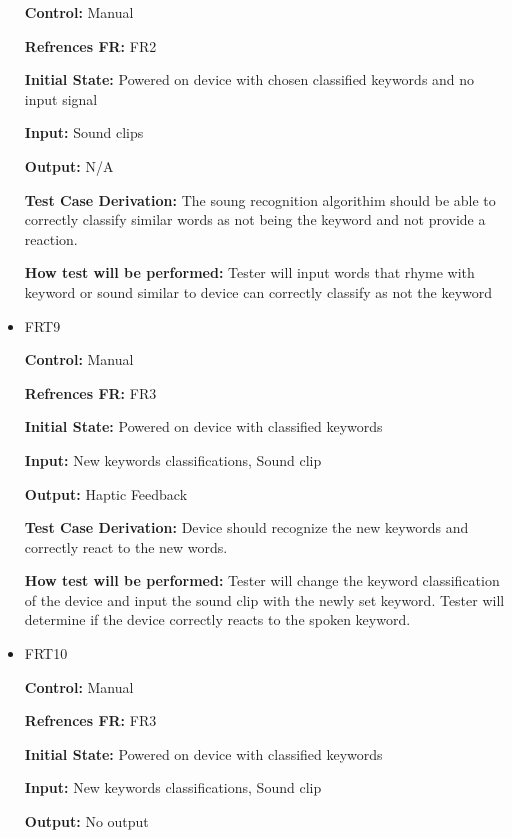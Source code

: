 \documentclass[12pt, titlepage]{article}
\begin{document}
\begin{itemize}
\textbf{Control:} Manual

\textbf{Refrences FR:} FR2 					

\textbf{Initial State:} Powered on device with chosen classified keywords and no input signal  
					
\textbf{Input:} Sound clips
					
\textbf{Output:} N/A

\textbf{Test Case Derivation:} The soung recognition algorithim should be able to correctly classify similar words as not being the keyword and not provide a reaction.
					
\textbf{How test will be performed:} Tester will input words that rhyme with keyword or sound similar to device can correctly classify as not the keyword


\item{FRT9}

\textbf{Control:} Manual

\textbf{Refrences FR:} FR3 					

\textbf{Initial State:} Powered on device with classified keywords 
					
\textbf{Input:} New keywords classifications, Sound clip
					
\textbf{Output:} Haptic Feedback

\textbf{Test Case Derivation:} Device should recognize the new keywords and correctly react to the new words.
					
\textbf{How test will be performed:} Tester will change the keyword classification of the device and input the sound clip with the newly set keyword. Tester will determine if the device correctly reacts to the spoken keyword.


\item{FRT10}

\textbf{Control:} Manual

\textbf{Refrences FR:} FR3 					

\textbf{Initial State:} Powered on device with classified keywords
					
\textbf{Input:} New keywords classifications, Sound clip
					
\textbf{Output:} No output


\end{itemize}
\end{document}
